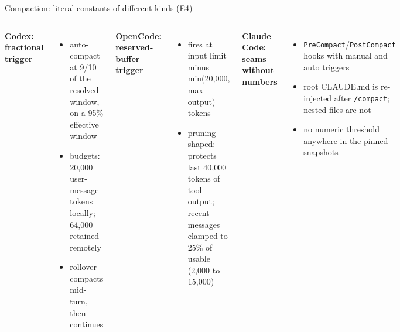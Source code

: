 \documentclass[aspectratio=169,11pt]{beamer}
\newcommand{\codex}[0]{Codex}
\newcommand{\occ}[0]{OpenCode}
\newcommand{\ccc}[0]{Claude Code}
\begin{document}
\begin{frame}{Compaction: literal constants of different kinds (E4)}
  \small
  \begin{columns}[T]
      \textbf{\codex{}: fractional trigger}~\citep{codexRepo}
      \begin{itemize}
        \item auto-compact at 9/10 of the resolved window, on a 95\%
          effective window
        \item budgets: 20{,}000 user-message tokens locally; 64{,}000
          retained remotely
        \item rollover compacts mid-turn, then continues
      \end{itemize}
      \smallskip
      \textbf{\occ{}: reserved-buffer trigger}~\citep{opencodeRepo}
      \begin{itemize}
        \item fires at input limit minus min(20{,}000, max-output)
          tokens
        \item pruning-shaped: protects last 40{,}000 tokens of tool
          output; recent messages clamped to 25\% of usable (2{,}000 to
          15{,}000)
      \end{itemize}
      \textbf{\ccc{}: seams without numbers}
      \begin{itemize}
        \item \texttt{PreCompact}/\texttt{PostCompact} hooks with manual
          and auto triggers~\citep{claudeCodeDocsHooks}
        \item root CLAUDE.md is re-injected after \texttt{/compact};
          nested files are not~\citep{claudeCodeDocsMemory}
        \item no numeric threshold anywhere in the pinned snapshots
      \end{itemize}
  \end{columns}
\end{frame}
\end{document}
